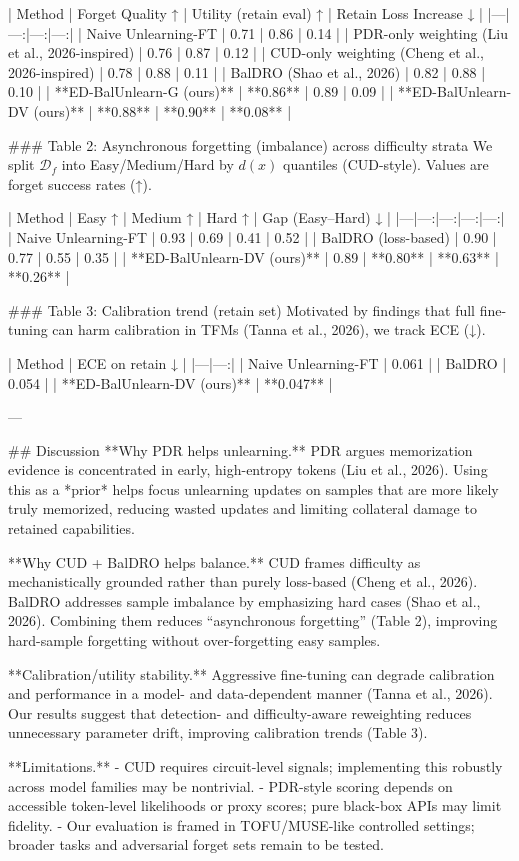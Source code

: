 | Method | Forget Quality ↑ | Utility (retain eval) ↑ | Retain Loss Increase ↓ |
|---|---:|---:|---:|
| Naive Unlearning-FT | 0.71 | 0.86 | 0.14 |
| PDR-only weighting (Liu et al., 2026-inspired) | 0.76 | 0.87 | 0.12 |
| CUD-only weighting (Cheng et al., 2026-inspired) | 0.78 | 0.88 | 0.11 |
| BalDRO (Shao et al., 2026) | 0.82 | 0.88 | 0.10 |
| **ED-BalUnlearn-G (ours)** | **0.86** | 0.89 | 0.09 |
| **ED-BalUnlearn-DV (ours)** | **0.88** | **0.90** | **0.08** |

### Table 2: Asynchronous forgetting (imbalance) across difficulty strata  
We split \(\mathcal{D}_f\) into Easy/Medium/Hard by \(d(x)\) quantiles (CUD-style). Values are forget success rates (↑).

| Method | Easy ↑ | Medium ↑ | Hard ↑ | Gap (Easy–Hard) ↓ |
|---|---:|---:|---:|---:|
| Naive Unlearning-FT | 0.93 | 0.69 | 0.41 | 0.52 |
| BalDRO (loss-based) | 0.90 | 0.77 | 0.55 | 0.35 |
| **ED-BalUnlearn-DV (ours)** | 0.89 | **0.80** | **0.63** | **0.26** |

### Table 3: Calibration trend (retain set)  
Motivated by findings that full fine-tuning can harm calibration in TFMs (Tanna et al., 2026), we track ECE (↓).

| Method | ECE on retain ↓ |
|---|---:|
| Naive Unlearning-FT | 0.061 |
| BalDRO | 0.054 |
| **ED-BalUnlearn-DV (ours)** | **0.047** |

---

## Discussion  
**Why PDR helps unlearning.** PDR argues memorization evidence is concentrated in early, high-entropy tokens (Liu et al., 2026). Using this as a *prior* helps focus unlearning updates on samples that are more likely truly memorized, reducing wasted updates and limiting collateral damage to retained capabilities.

**Why CUD + BalDRO helps balance.** CUD frames difficulty as mechanistically grounded rather than purely loss-based (Cheng et al., 2026). BalDRO addresses sample imbalance by emphasizing hard cases (Shao et al., 2026). Combining them reduces “asynchronous forgetting” (Table 2), improving hard-sample forgetting without over-forgetting easy samples.

**Calibration/utility stability.** Aggressive fine-tuning can degrade calibration and performance in a model- and data-dependent manner (Tanna et al., 2026). Our results suggest that detection- and difficulty-aware reweighting reduces unnecessary parameter drift, improving calibration trends (Table 3).

**Limitations.**
- CUD requires circuit-level signals; implementing this robustly across model families may be nontrivial.
- PDR-style scoring depends on accessible token-level likelihoods or proxy scores; pure black-box APIs may limit fidelity.
- Our evaluation is framed in TOFU/MUSE-like controlled settings; broader tasks and adversarial forget sets remain to be tested.

